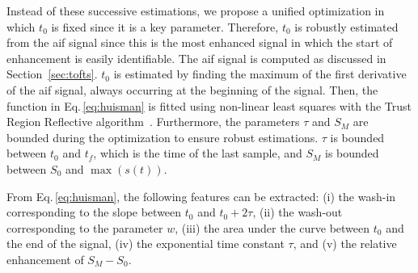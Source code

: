 Instead of these successive estimations, we propose a unified optimization in which $t_0$ is fixed since it is a key parameter.
Therefore, $t_0$ is robustly estimated from the \ac{aif} signal since this is the most enhanced signal in which the start of enhancement is easily identifiable.
The \ac{aif} signal is computed as discussed in Section~\ref{sec:tofts}.
$t_0$ is estimated by finding the maximum of the first derivative of the \ac{aif} signal, always occurring at the beginning of the signal.
Then, the function in Eq.\,\eqref{eq:huisman} is fitted using non-linear least squares with the Trust Region Reflective algorithm~\citep{sorensen1982newton}.
Furthermore, the parameters $\tau$ and $S_M$ are bounded during the optimization to ensure robust estimations.
$\tau$ is bounded between $t_0$ and $t_f$, which is the time of the
last sample, and $S_M$ is bounded between $S_0$ and $\max(s(t))$.


From Eq.\,\eqref{eq:huisman}, the following features can be extracted:
(i) the wash-in corresponding to the slope between $t_0$ and $t_0 + 2 \tau$,
(ii) the wash-out corresponding to the parameter $w$,
(iii) the area under the curve between $t_0$ and the end of the signal,
(iv) the exponential time constant $\tau$, and
(v) the relative enhancement of $S_M - S_0$.


